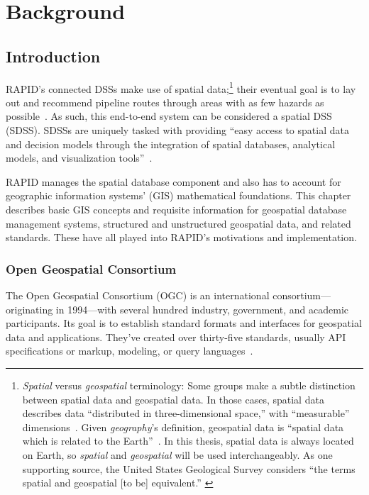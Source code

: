 \chapter{Background}
\label{background}

\section{Introduction}
\label{background_intro}
RAPID's connected DSSs make use of spatial data;\footnote{\textit{Spatial} versus \textit{geospatial} terminology: Some groups make a subtle distinction between spatial data and geospatial data. In those cases, spatial data describes data ``distributed in three-dimensional space,'' with ``measurable'' dimensions~\cite{Bhatta2011}. Given \textit{geography}'s definition, geospatial data is ``spatial data which is related to the Earth''~\cite{Bhatta2011}. In this thesis, spatial data is always located on Earth, so \textit{spatial} and \textit{geospatial} will be used interchangeably. As one supporting source, the United States Geological Survey considers ``the terms spatial and geospatial [to be] equivalent.''
\cite{Bhatta2011}} their eventual goal is to lay out and recommend pipeline routes through areas with as few hazards as possible~\cite{Dunning2013}. As such, this end-to-end system can be considered a spatial DSS (SDSS). SDSSs are uniquely tasked with providing ``easy access to spatial data and decision models through the integration of spatial databases, analytical models, and visualization tools''~\cite{RedlandsSDSS}.

RAPID manages the spatial database component and also has to account for geographic information systems' (GIS) mathematical foundations. This chapter describes basic GIS concepts and requisite information for geospatial database management systems, structured and unstructured geospatial data, and related standards. These have all played into RAPID's motivations and implementation.

\subsection{Open Geospatial Consortium}
The Open Geospatial Consortium (OGC) is an international consortium---originating in 1994---with several hundred industry, government, and academic participants. Its goal is to establish standard formats and interfaces for geospatial data and applications. They've created over thirty-five standards, usually API specifications or markup, modeling, or query languages~\cite{ogc}.

